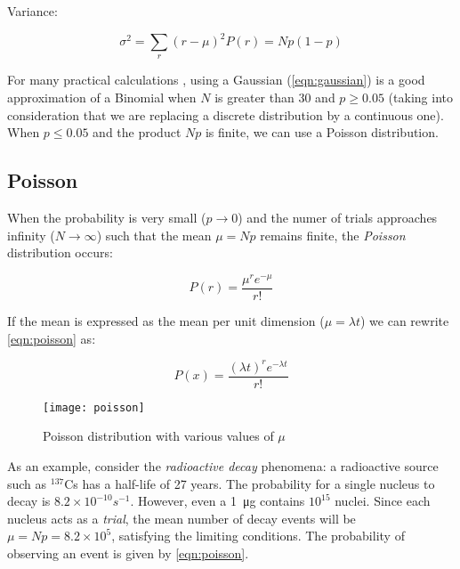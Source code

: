 Variance:

\begin{equation}
	\sigma^2=\sum_r(r-\mu)^2P(r) = Np(1-p)
\end{equation}

For many practical calculations \cite{leo2012techniques}, using a Gaussian (\ref{eqn:gaussian}) is a good approximation of a Binomial when $N$ is greater than 30 and $p\geq0.05$ (taking into consideration that we are replacing a discrete distribution by a continuous one). When $p\leq0.05$ and the product $Np$ is finite, we can use a Poisson distribution.

\subsection{Poisson}
\label{distributions1}

When the probability is very small ($p \rightarrow 0$) and the numer of trials approaches infinity ($N \rightarrow \infty$) such that the mean $\mu = N p$ remains finite, the \textit{Poisson} distribution occurs:


\begin{equation}
	\label{eqn:poisson}
	P\left( r \right) = \frac{{\mu^{ r } e ^{-\mu} }}{{r!}}
\end{equation}

If the mean is expressed as the mean per unit dimension ($\mu = \lambda t$) we can rewrite \ref{eqn:poisson} as:

\begin{equation}
	P\left( x \right) = \frac{(\lambda t) ^r {e^{ - \lambda t}} }{{r!}}
\end{equation}

\begin{figure}
	\centerline{
		\texttt{[image: poisson]}}
	\caption{Poisson distribution with various values of $\mu$ \cite{leo2012techniques}}
\end{figure}


As an example, consider the \textit{radioactive decay} phenomena: a radioactive source such as $^{137}$Cs has a half-life of 27 years. The probability for a single nucleus to decay is $8.2 \times 10^{-10}s^{-1}$. However, even a \SI{1}{\micro\gram} contains $10^{15}$ nuclei. Since each nucleus acts as a \textit{trial}, the mean number of decay events will be $\mu = N p = 8.2 \times 10^5$, satisfying the limiting conditions. The probability of observing an event is given by \ref{eqn:poisson}.

